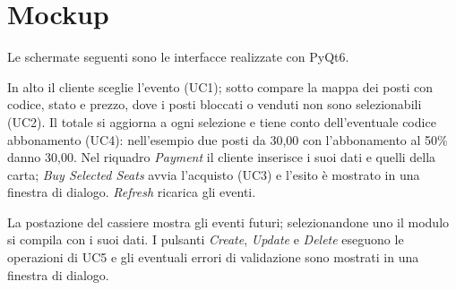 \section{Mockup}
\label{sec:mockup}

Le schermate seguenti sono le interfacce realizzate con PyQt6.


In alto il cliente sceglie l'evento (UC1); sotto compare la mappa dei posti con codice, stato e prezzo, dove i posti bloccati o venduti non sono selezionabili (UC2). Il totale si aggiorna a ogni selezione e tiene conto dell'eventuale codice abbonamento (UC4): nell'esempio due posti da 30,00 con l'abbonamento al 50\% danno 30,00. Nel riquadro \emph{Payment} il cliente inserisce i suoi dati e quelli della carta; \emph{Buy Selected Seats} avvia l'acquisto (UC3) e l'esito è mostrato in una finestra di dialogo. \emph{Refresh} ricarica gli eventi.


La postazione del cassiere mostra gli eventi futuri; selezionandone uno il modulo si compila con i suoi dati. I pulsanti \emph{Create}, \emph{Update} e \emph{Delete} eseguono le operazioni di UC5 e gli eventuali errori di validazione sono mostrati in una finestra di dialogo.
